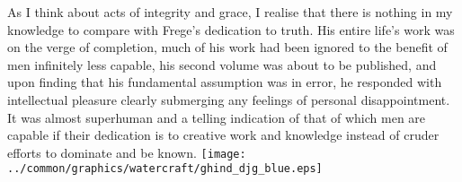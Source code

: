   {As I think about acts of integrity and grace,
   I realise that there is nothing in my knowledge to compare with Frege's dedication to truth.
   His entire life's work was on the verge of completion,
   much of his work had been ignored to the benefit of men infinitely less capable,
   his second volume was about to be published, and upon finding that his fundamental assumption
   was in error, 
   he responded with intellectual pleasure clearly submerging any feelings of personal disappointment.
   It was almost superhuman and a telling indication of that of which men are capable if their
   dedication is to creative work and knowledge instead of cruder efforts to dominate and be 
   known.}
\vfill
\hfill\texttt{[image: ../common/graphics/watercraft/ghind\_djg\_blue.eps]}%
\cleartoevenpage
\mbox{}%
\addtocounter{footnote}{-2}%
%
%
%
%
%










